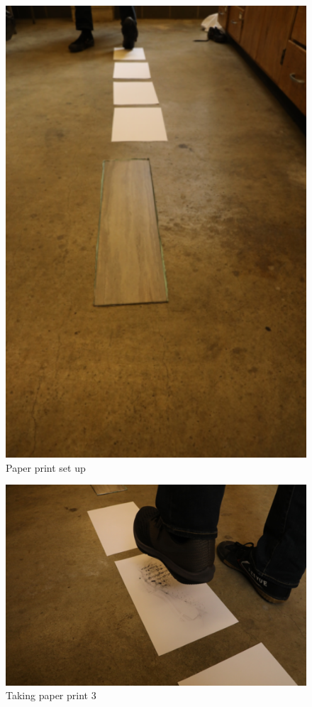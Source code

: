 \begin{figure}[!htp]
\centering
\includegraphics[width=12cm, angle=-90]{Path}
\caption{Paper print set up}
\label{Image 17}
\end{figure}

\begin{figure}[!htp]
\centering
\includegraphics[width=12cm]{Stomp}
\caption{Taking paper print 3}
\label{Image 18}
\end{figure}

